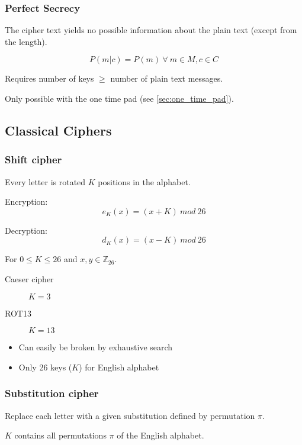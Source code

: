 \documentclass[a4paper]{article}
\begin{document}
\subsubsection{Perfect Secrecy}

The cipher text yields no possible information about the plain text (except from
the length).

\[
  P(m|c) = P(m) \: \forall \: m \in M, c \in C
\]

Requires number of keys $\geq$ number of plain text messages.

Only possible with the one time pad (see \ref{sec:one_time_pad}).

\subsection{Classical Ciphers}

\subsubsection{Shift cipher}

Every letter is rotated $K$ positions in the alphabet.

Encryption:
\[
  e_{K}(x) = (x + K) \: mod \: 26
\]

Decryption:
\[
  d_{K}(x) = (x - K) \: mod \: 26
\]

For $0 \leq K \leq 26$ and $x, y \in \mathbb{Z}_{26}$.

\begin{description}
  \item[Caeser cipher]
    $K=3$
  \item[ROT13]
    $K=13$
\end{description}


\begin{itemize}
  \item Can easily be broken by exhaustive search
  \item Only 26 keys ($K$) for English alphabet
\end{itemize}

\subsubsection{Substitution cipher}

Replace each letter with a given substitution defined by permutation $\pi$.

$K$ contains all permutations $\pi$ of the English alphabet.
\end{document}
